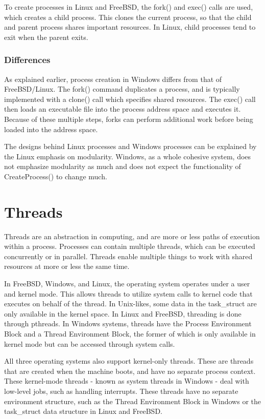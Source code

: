 \documentclass[journal, letterpaper, draftclsnofoot, onecolumn, 10pt]{IEEEtran}
\begin{document}
To create processes in Linux and FreeBSD, the fork() and exec() calls are used, which creates a child process. This clones the current process, so that the child and parent process shares important resources.  In Linux, child processes tend to exit when the parent exits.

\subsubsection{Differences}
As explained earlier, process creation in Windows differs from that of FreeBSD/Linux. The fork() command duplicates a process, and is typically implemented with a clone() call which specifies shared resources. The exec() call then loads an executable file into the process address space and executes it. Because of these multiple steps, forks can perform additional work before being loaded into the address space.

The designs behind Linux processes and Windows processes can be explained by the Linux emphasis on modularity. Windows, as a whole cohesive system, does not emphasize modularity as much and does not expect the functionality of CreateProcess() to change much.

\section{Threads}

Threads are an abstraction in computing, and are more or less paths of execution within a process. Processes can contain multiple threads, which can be executed concurrently or in parallel. Threads enable multiple things to work with shared resources at more or less the same time.

In FreeBSD, Windows, and Linux, the operating system operates under a user and kernel mode. This allows threads to utilize system calls to kernel code that executes on behalf of the thread. In Unix-likes, some data in the task\_struct are only available in the kernel space. In Linux and FreeBSD, threading is done through pthreads. In Windows systems, threads have the Process Environment Block and a Thread Environment Block, the former of which is only available in kernel mode but can be accessed through system calls.

All three operating systems also support kernel-only threads. These are threads that are created when the machine boots, and have no separate process context. These kernel-mode threads - known as system threads in Windows - deal with low-level jobs, such as handling interrupts. These threads have no separate environment structure, such as the Thread Environment Block in Windows or the task\_struct data structure in Linux and FreeBSD.
\end{document}
